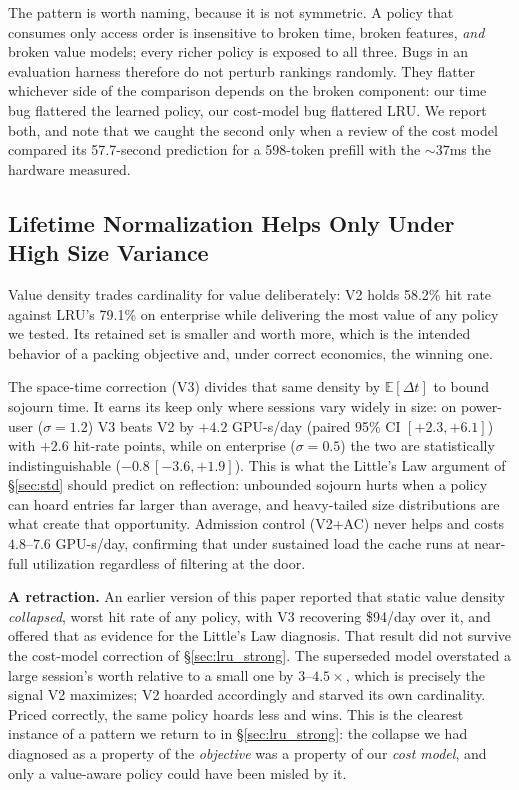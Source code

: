 \documentclass[letterpaper,twocolumn,10pt]{article}
\begin{document}
The pattern is worth naming, because it is not symmetric. A policy that consumes only access order is insensitive to broken time, broken features, \emph{and} broken value models; every richer policy is exposed to all three. Bugs in an evaluation harness therefore do not perturb rankings randomly. They flatter whichever side of the comparison depends on the broken component: our time bug flattered the learned policy, our cost-model bug flattered LRU. We report both, and note that we caught the second only when a review of the cost model compared its 57.7-second prediction for a 598-token prefill with the ${\sim}37$ms the hardware measured.

\subsection{Lifetime Normalization Helps Only Under High Size Variance}
\label{sec:whystatic}

Value density trades cardinality for value deliberately: V2 holds 58.2\% hit rate against LRU's 79.1\% on enterprise while delivering the most value of any policy we tested. Its retained set is smaller and worth more, which is the intended behavior of a packing objective and, under correct economics, the winning one.

The space-time correction (V3) divides that same density by $\mathbb{E}[\Delta t]$ to bound sojourn time. It earns its keep only where sessions vary widely in size: on power-user ($\sigma{=}1.2$) V3 beats V2 by $+4.2$ GPU-s/day (paired 95\% CI $[+2.3, +6.1]$) with $+2.6$ hit-rate points, while on enterprise ($\sigma{=}0.5$) the two are statistically indistinguishable ($-0.8$\,$[-3.6,+1.9]$). This is what the Little's Law argument of \S\ref{sec:std} should predict on reflection: unbounded sojourn hurts when a policy can hoard entries far larger than average, and heavy-tailed size distributions are what create that opportunity. Admission control (V2+AC) never helps and costs $4.8$--$7.6$ GPU-s/day, confirming that under sustained load the cache runs at near-full utilization regardless of filtering at the door.

\textbf{A retraction.} An earlier version of this paper reported that static value density \emph{collapsed}, worst hit rate of any policy, with V3 recovering \$94/day over it, and offered that as evidence for the Little's Law diagnosis. That result did not survive the cost-model correction of \S\ref{sec:lru_strong}. The superseded model overstated a large session's worth relative to a small one by $3\text{--}4.5\times$, which is precisely the signal V2 maximizes; V2 hoarded accordingly and starved its own cardinality. Priced correctly, the same policy hoards less and wins. This is the clearest instance of a pattern we return to in \S\ref{sec:lru_strong}: the collapse we had diagnosed as a property of the \emph{objective} was a property of our \emph{cost model}, and only a value-aware policy could have been misled by it.
\end{document}

